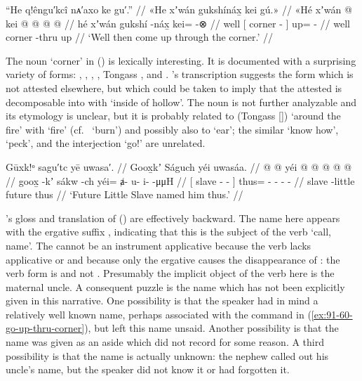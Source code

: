 \ex\label{ex:91-60-go-up-thru-corner}%
%
\begingl
	\glpreamble	“He q!êngu′kcî nᴀ′axo ke gu′.” //
	\glpreamble	«\!He xʼwán gukshínáx̱ kei gú.\!» //
	\gla	«\!Hé xʼwán {}  @ {} {}
		kei @  @ {} @ {} @ {} //
	\glb	\pqp{}hé xʼwán {} gukshí -náx̱ {}
		kei= {} {}  -⊗ //
	\glc	\pqp{}well  {}[ corner - {}]
		up= \· \·  - //
	\gld	\pqp{}well  {} corner -thru {}
		up  {} {} {} //
	\glft	‘Well then come up through the corner.’
		//
\endgl
\xe

The noun  ‘corner’ in (\lastx) is lexically interesting.
It is documented with a surprising variety of forms: , , , , Tongass  \parencite[f05/170]{leer:1973}, and  \parencite[\textsc{t}·18]{leer:2001}.
\citeauthor{swanton:1909}’s transcription  suggests the form  which is not attested elsewhere, but which could be taken to imply that the attested  is decomposable into  with  ‘inside of hollow’.
The noun  is not further analyzable and its etymology is unclear, but it is probably related to  (Tongass  []) ‘around the fire’ with  ‘fire’ (cf.\  ‘burn’) and possibly also to  ‘ear’; the similar  ‘know how’,  ‘peck’, and the interjection  ‘go!’ are unrelated.

\ex\label{ex:91-61-named-him}%
%
\begingl
	\glpreamble	Gūxk!ᵒ sagu′tc yē uwasa′. //
	\glpreamble	Goox̱kʼ Ságuch yéi uwasáa. //
	\gla	{}  @ {}  @ {} {}
		yéi @  @ {} @ {} @ {} @ {} //
	\glb	{} goox̱ -kʼ sákw -ch {}
		yéi= ⱥ- u- i-  -μμH //
	\glc	{}[ slave -  - {}]
		thus= - - -  - //
	\gld	{} slave -little future {} {}
		thus  {} {} {} {} //
	\glft	‘Future Little Slave named him thus.’
		//
\endgl
\xe

\citeauthor{swanton:1909}’s gloss and translation of (\lastx) are effectively backward.
The name  here appears with the ergative suffix , indicating that this is the subject of the verb  ‘call, name’.
The  cannot be an instrument applicative because the verb lacks applicative  or  and because only the ergative  causes the disappearance of : the verb form is  and not .
Presumably the implicit object of the verb here is the maternal uncle.
A consequent puzzle is the name which has not been explicitly given in this narrative.
One possibility is that the speaker had in mind a relatively well known name, perhaps associated with the command in (\ref{ex:91-60-go-up-thru-corner}), but left this name unsaid.
Another possibility is that the name was given as an aside which \citeauthor{swanton:1909} did not record for some reason.
A third possibility is that the name is actually unknown: the nephew called out his uncle’s name, but the speaker did not know it or had forgotten it.

